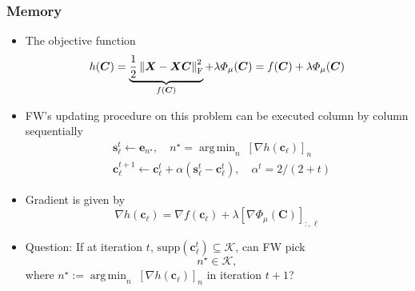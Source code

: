 \documentclass[10pt,xcolor={usenames,dvipsnames,table}]{beamer}
\newcommand{\norm}[1]{\left\lVert#1\right\rVert}
\DeclareMathOperator*{\argmin}{arg\,min}
\begin{document}
\begin{frame}
\frametitle{Memory}    
\begin{itemize}
    \item The objective function 
        \[
        h(\bm{C}) = \underbrace{\dfrac{1}{2} \norm{\bm{X} - \bm{X}\bm{C}}_{\rm F}^2}_{f(\bm{C})} + \lambda \varPhi_{\mu}(\bm{C}) = f(\bm{C}) + \lambda \varPhi_{\mu}(\bm{C})
    \]
    \item FW's updating procedure on this problem can be executed column by column sequentially
    \begin{align*}
    &\bm{s}_\ell^{t} \leftarrow \bm{e}_{n^{\star}}, \quad n^{\star} = \argmin_{n} \; [\nabla h(\bm{c}_\ell)]_n  \\
    &\bm{c}_\ell^{t+1} \leftarrow \bm{c}_\ell^{t} + \alpha (\bm{s}_{\ell}^{t}-\bm{c}_{\ell}^{t}), \quad \alpha^{t} = 2/(2+t)
    \end{align*} 
    \item Gradient is given by
\[ 
    \nabla h(\bm{c}_\ell) = \nabla f(\bm{c}_\ell) + \lambda [\nabla \varPhi_{\mu}(\bm{C})]_{:, \ell} 
\] 
\item Question: If at iteration $t$,  $\text{supp}(\bm{c}_\ell^{t}) \subseteq \mathcal{K}$, can FW pick 
    \[ n^{\star} \in \mathcal{K}, \] where
    $n^{\star} := \argmin_{n}\;[\nabla h(\bm{c}_\ell)]_n$ in iteration $t+1$?
\end{itemize}



\end{frame}
\end{document}
